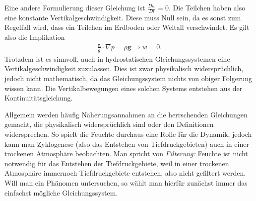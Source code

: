 \documentclass{book}
\newcommand{\md}[1]{\frac{D#1}{Dt}}
\begin{document}
Eine andere Formulierung dieser Gleichung ist $\md{w} = 0$. Die Teilchen haben also eine konstante Vertikalgeschwindigkeit. Diese muss Null sein, da es sonst zum Regelfall wird, dass ein Teilchen im Erdboden oder Weltall verschwindet. Es gilt also die Implikation
%
\begin{eqnarray}
\frac{\mathbf{g}}{g}\cdot\nabla p = \rho\mathbf{g} \Rightarrow w = 0.
\end{eqnarray}
%
Trotzdem ist es sinnvoll, auch in hydrostatischen Gleichungssystemen eine Vertikalgeschwindigkeit zuzulassen. Dies ist zwar physikalisch widersprüchlich, jedoch nicht mathematisch, da das Gleichungssystem nichts von obiger Folgerung wissen kann. Die Vertikalbewegungen eines solchen Systems entstehen aus der Kontinuitätsgleichung.

Allgemein werden häufig Näherungsannahmen an die herrschenden Gleichungen gemacht, die physikalisch widersprüchlich sind oder den Definitionen widersprechen. So spielt die Feuchte durchaus eine Rolle für die Dynamik, jedoch kann man Zyklogenese (also das Entstehen von Tiefdruckgebieten) auch in einer trockenen Atmosphäre beobachten. Man spricht von \textit{Filterung:} Feuchte ist nicht notwendig für das Entstehen der Tiefdruckgebiete, weil in einer trockenen Atmosphäre immernoch Tiefdruckgebiete entstehen, also nicht gefiltert werden. Will man ein Phänomen untersuchen, so wählt man hierfür zunächst immer das einfachst mögliche Gleichungssystem.
\end{document}
